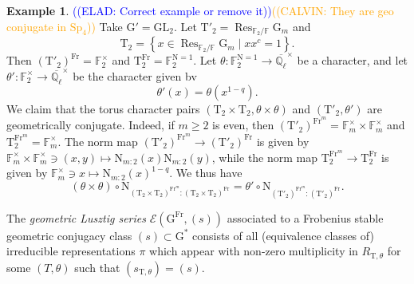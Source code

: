 \documentclass[12pt, reqno]{amsart}
\theoremstyle{definition}
\theoremstyle{definition}
\theoremstyle{definition}
\newtheorem{example}[theorem]{Example}
\newcommand{\multiplicativegroup}[1]{#1^{\times}}
\newcommand{\involution}[1]{#1^{c}}
\newcommand{\GL}{\mathrm{GL}}
\newcommand{\FieldNorm}[2]{\mathrm{N}_{#1:#2}}
\newcommand{\aFieldNorm}{\mathrm{N}}
\newcommand{\finiteField}{\mathbb{F}}
\newcommand{\finiteFieldExtension}[1]{\finiteField_{#1}}
\newcommand{\NormOneGroup}[1]{\finiteFieldExtension{#1}^{\aFieldNorm = 1}}
\newcommand{\algebraicClosure}[1]{\overline{#1}}
\newcommand{\Frobenius}{\operatorname{Fr}}
\newcommand{\restrictionOfScalars}[3]{\operatorname{Res}_{#1 \slash #2}{#3}}
\newcommand{\multiplcativeScheme}{\algebraicGroup{G}_m}
\newcommand{\ladicnumbers}{\algebraicClosure{\mathbb{Q}_{\ell}}}
\newcommand{\algebraicGroup}[1]{\boldsymbol{\mathrm{#1}}}
\newcommand{\LusztigSeries}[2]{\mathcal{E}\left(#1, (#2)\right)}
\newcommand{\calvin}[1]{\textcolor{orange}{\sffamily ((CALVIN: #1))}}
\newcommand{\elad}[1]{\textcolor{blue}{\sffamily ((ELAD: #1))}}
\begin{document}
\begin{example}
	\elad{Correct example or remove it}\calvin{They are geo conjugate in $\algebraicGroup{Sp}_4$}
	Take $\algebraicGroup{G}' = \algebraicGroup{\GL}_2$. Let $\algebraicGroup{T}'_2 = \restrictionOfScalars{\finiteFieldExtension{2}}{\finiteField}{\multiplcativeScheme}$ and $$\algebraicGroup{T}_2 = \left\{x \in \restrictionOfScalars{\finiteFieldExtension{2}}{\finiteField}{\multiplcativeScheme} \mid x \involution{x} = 1 \right\}.$$
	Then $\left(\algebraicGroup{T}'_2\right)^{\Frobenius} = \multiplicativegroup{\finiteFieldExtension{2}}$ and $\algebraicGroup{T}_2^{\Frobenius} = \NormOneGroup{2}$. Let $\theta \colon \NormOneGroup{2} \to \multiplicativegroup{\ladicnumbers}$ be a character, and let $\theta' \colon \multiplicativegroup{\finiteFieldExtension{2}} \to \multiplicativegroup{\ladicnumbers}$ be the character given bv $$\theta'\left(x\right) = \theta\left(x^{1-q}\right).$$
	We claim that the torus character pairs $\left(\algebraicGroup{T}_2 \times \algebraicGroup{T}_2, \theta \times \theta\right)$ and $\left(\algebraicGroup{T}'_2, \theta'\right)$ are geometrically conjugate. Indeed, if $m \ge 2$ is even, then $\left(\algebraicGroup{T}'_2\right)^{\Frobenius^{m}} = \multiplicativegroup{\finiteFieldExtension{m}} \times \multiplicativegroup{\finiteFieldExtension{m}}$ and $\algebraicGroup{T}_2^{\Frobenius^m} = \multiplicativegroup{\finiteFieldExtension{m}}$. The norm map $\left(\algebraicGroup{T}'_2\right)^{\Frobenius^{m}} \to \left(\algebraicGroup{T}'_2\right)^{\Frobenius}$ is given by $\multiplicativegroup{\finiteFieldExtension{m}} \times \multiplicativegroup{\finiteFieldExtension{m}} \ni \left(x,y\right) \mapsto \FieldNorm{m}{2}\left(x\right) \FieldNorm{m}{2}\left(y\right)$, while the norm map $\algebraicGroup{T}_2^{\Frobenius^{m}} \to \algebraicGroup{T}_2^{\Frobenius}$ is given by $\multiplicativegroup{\finiteFieldExtension{m}} \ni x \mapsto \FieldNorm{m}{2}\left(x\right)^{1-q}$. We thus have
	$$\left(\theta \times \theta\right) \circ \aFieldNorm_{ \left(\algebraicGroup{T}_2 \times \algebraicGroup{T}_2\right)^{\Frobenius^m} : \left(\algebraicGroup{T}_2 \times \algebraicGroup{T}_2\right)^{\Frobenius} } = \theta' \circ \aFieldNorm_{\left(\algebraicGroup{T}'_2\right)^{\Frobenius^m} \colon \left(\algebraicGroup{T}'_2\right)^{\Frobenius}}.$$
\end{example}

The \emph{geometric Lusztig series} $\LusztigSeries{\algebraicGroup{G}^{\Frobenius}}{s}$ associated to a Frobenius stable geometric conjugacy class $(s) \subset \algebraicGroup{G}^*$ consists of all (equivalence classes of) irreducible representations $\pi$ which appear with non-zero multiplicity in $R_{\algebraicGroup{T}, \theta}$ for some $(T,\theta)$ such that $(s_{\algebraicGroup{T},\theta}) = (s)$.
\end{document}

